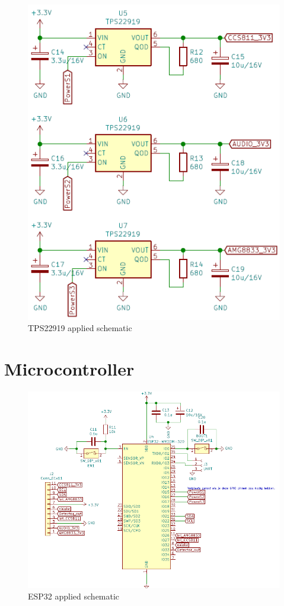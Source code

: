 \documentclass[11pt,a4paper]{article}
\begin{document}
\begin{figure}[H]
	\centering
	\includegraphics[width=0.8\linewidth]{TPS22919_toegepast.png}
	\caption{TPS22919 applied schematic}
	\label{fig:TPS22919_toegepast}
\end{figure}


\section{Microcontroller}
\begin{figure}[H]
	\centering
	\includegraphics[width=1.0\linewidth]{ESP32_toegepast.png}
	\caption{ESP32 applied schematic}
	\label{fig:ESP32_toegepast}
\end{figure}
\end{document}
